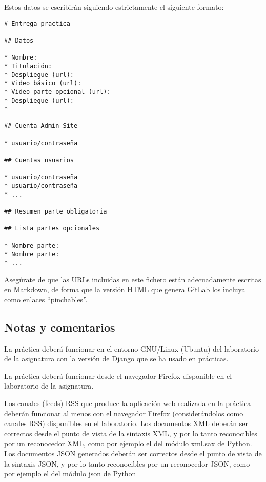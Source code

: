 \begin{itemize}
Estos datos se escribirán siguiendo estrictamente el siguiente formato:

\begin{verbatim}
# Entrega practica

## Datos

* Nombre:
* Titulación:
* Despliegue (url):
* Video básico (url):
* Video parte opcional (url):
* Despliegue (url):
*

## Cuenta Admin Site

* usuario/contraseña

## Cuentas usuarios

* usuario/contraseña
* usuario/contraseña
* ...

## Resumen parte obligatoria

## Lista partes opcionales

* Nombre parte:
* Nombre parte:
* ...
\end{verbatim}

Asegúrate de que las URLs incluidas en este fichero están adecuadamente escritas en Markdown, de forma que la versión HTML que genera GitLab los incluya como enlaces ``pinchables''.
\end{itemize}


\subsection{Notas y comentarios}

La práctica deberá funcionar en el entorno GNU/Linux (Ubuntu) del laboratorio de la asignatura con la versión de Django que se ha usado en prácticas.

La práctica deberá funcionar desde el navegador Firefox disponible en el laboratorio de la asignatura.

Los canales (feeds) RSS que produce la aplicación web realizada en la práctica deberán funcionar al menos con el navegador Firefox (considerándolos como canales RSS) disponibles en el laboratorio. Los documentos XML deberán ser correctos desde el punto de vista de la sintaxis XML, y por lo tanto reconocibles por un reconocedor XML, como por ejemplo el del módulo xml.sax de Python. Los documentos JSON generados deberán ser correctos desde el punto de vista de la sintaxis JSON, y por lo tanto reconocibles por un reconocedor JSON, como por ejemplo el del módulo json de Python

